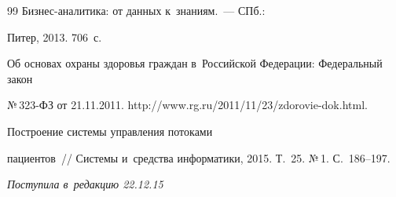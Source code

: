 {{\begin{thebibliography}{99}
   Биз\-нес-ана\-ли\-ти\-ка: от данных к~знаниям.~--- СПб.: 


Питер, 2013. 706~с.




  Об основах охраны здоровья граждан в~Российской Федерации: Федеральный закон 


№\,323-ФЗ от 21.11.2011. {\sf http://www.rg.ru/2011/11/23/zdorovie-dok.html}.




   Построение сис\-те\-мы управ\-ле\-ния потоками 


пациентов~/\!\!/ Системы и~средства информатики, 2015. Т.~25. №\,1. С.~186--197.


     \end{thebibliography}


} }








\vspace*{-2pt}





\hfill{\small\textit{Поступила в~редакцию 22.12.15}}


































\newpage





\vspace*{-24pt}











